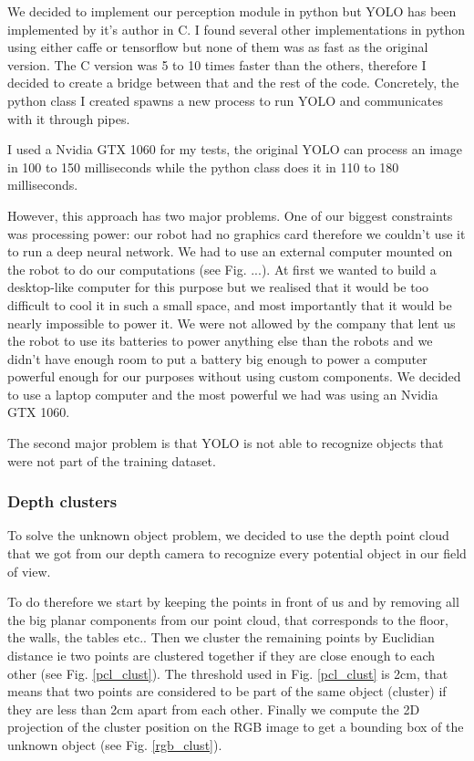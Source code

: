 \documentclass[a4paper, twocolumn]{article}
\begin{document}
    We decided to implement our perception module in python but YOLO has been implemented by it's author in C. I found several other implementations in python using either caffe or tensorflow but none of them was as fast as the original version. The C version was 5 to 10 times faster than the others, therefore I decided to create a bridge between that and the rest of the code. Concretely, the python class I created spawns a new process to run YOLO and communicates with it through pipes.

    I used a Nvidia GTX 1060 for my tests, the original YOLO can process an image in 100 to 150 milliseconds while the python class does it in 110 to 180 milliseconds.

    However, this approach has two major problems. One of our biggest constraints was processing power: our robot had no graphics card therefore we couldn't use it to run a deep neural network. We had to use an external computer mounted on the robot to do our computations (see Fig. ...). At first we wanted to build a desktop-like computer for this purpose but we realised that it would be too difficult to cool it in such a small space, and most importantly that it would be nearly impossible to power it. We were not allowed by the company that lent us the robot to use its batteries to power anything else than the robots and we didn't have enough room to put a battery big enough to power a computer powerful enough for our purposes without using custom components. We decided to use a laptop computer and the most powerful we had was using an Nvidia GTX 1060.

    The second major problem is that YOLO is not able to recognize objects that were not part of the training dataset.

    \subsubsection{Depth clusters}

    To solve the unknown object problem, we decided to use the depth point cloud that we got from our depth camera to recognize every potential object in our field of view.

    To do therefore we start by keeping the points in front of us and by removing all the big planar components from our point cloud, that corresponds to the floor, the walls, the tables etc.. Then we cluster the remaining points by Euclidian distance ie two points are clustered together if they are close enough to each other (see Fig. \ref{pcl_clust}). The threshold used in Fig. \ref{pcl_clust} is 2cm, that means that two points are considered to be part of the same object (cluster) if they are less than 2cm apart from each other. Finally we compute the 2D projection of the cluster position on the RGB image to get a bounding box of the unknown object (see Fig. \ref{rgb_clust}).
\end{document}

